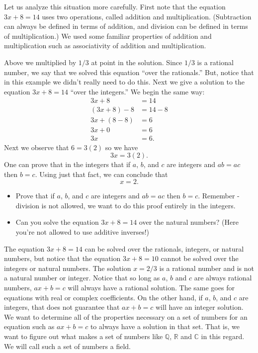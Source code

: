 \documentclass[11pt]{article}
\newenvironment{task}
	{\begin{mdframed}[linecolor=lightgray, linewidth=3pt]\raggedright}
	{\end{mdframed}}
\theoremstyle{definition}
\begin{document}
Let us analyze this situation more carefully. First note that the equation $3x+8 = 14$ uses two operations, called addition and multiplication. 
(Subtraction can always be defined in terms of addition, and division can be defined in terms of multiplication.)
We used some familiar properties of addition and multiplication such as associativity of addition and multiplication.

Above we multiplied by $1/3$ at point in the solution. Since $1/3$ is a rational number, we say that we solved this equation ``over the
rationals.'' But, notice that in this example we didn't really need to do this. Next we give a solution to the equation $3x+8=14$ ``over the
integers.'' We begin the same way:
\begin{align*}
  3x + 8 &= 14\\
 (3x+8)-8 &= 14 -8\\
 3x + (8-8) &= 6\\
 3x + 0 &= 6\\
 3x &= 6.
\end{align*}
Next we observe that $6 = 3(2)$ so we have
\[ 3x = 3(2).\]
One can prove that in the integers that if $a$, $b$, and $c$ are integers and $ab=ac$ then $b=c$. Using just that fact, we can conclude that
\[ x = 2.\]

\begin{task}
  \begin{itemize}
    \item Prove that if $a$, $b$, and $c$ are integers and $ab = ac$ then $b=c$. Remember - division is not allowed, we want to do this
      proof entirely in the integers.
    \item Can you solve the equation $3x+8=14$ over the natural numbers? (Here you're not allowed to use additive inverses!)
  \end{itemize}
\end{task}

The equation $3x+8=14$ can be solved over the rationals, integers, or natural numbers, but notice that the equation $3x+8=10$ cannot be solved over
the integers or natural numbers. The solution $x=2/3$ is a rational number and is not a natural number or integer. Notice that so long as $a$, $b$ and
$c$ are always rational numbers, $ax+b=c$ will always have a rational solution.  The same goes for equations with real or complex coefficients. On the
other hand, if $a$, $b$, and $c$ are integers, that does not guarantee that $ax+b=c$ will have an integer solution. We want to determine all of the 
properties necessary on a set of numbers for an equation such as $ax+b=c$ to always have a solution in that set. That is, we want to figure out
what makes a set of numbers like $\mathbb{Q}$, $\mathbb{R}$ and $\mathbb{C}$ in this regard. We will call such a set of numbers a field.
\end{document}
